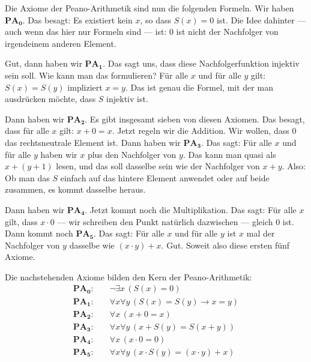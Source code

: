 \begin{spoken-clean}[00:07:37 - 00:11:00]
Die Axiome der Peano-Arithmetik sind nun die folgenden Formeln. Wir haben $\mathbf{PA_0}$. Das besagt: Es existiert kein $x$, so dass $S(x) = 0$ ist. Die Idee dahinter --- auch wenn das hier nur Formeln sind --- ist: $0$ ist nicht der Nachfolger von irgendeinem anderen Element.

Gut, dann haben wir $\mathbf{PA_1}$. Das sagt uns, dass diese Nachfolgerfunktion injektiv sein soll. Wie kann man das formulieren? Für alle $x$ und für alle $y$ gilt: $S(x) = S(y)$ impliziert $x = y$. Das ist genau die Formel, mit der man ausdrücken möchte, dass $S$ injektiv ist.

Dann haben wir $\mathbf{PA_2}$. Es gibt insgesamt sieben von diesen Axiomen. Das besagt, dass für alle $x$ gilt: $x + 0 = x$. Jetzt regeln wir die Addition. Wir wollen, dass $0$ das rechtsneutrale Element ist. Dann haben wir $\mathbf{PA_3}$. Das sagt: Für alle $x$ und für alle $y$ haben wir $x$ plus den Nachfolger von $y$. Das kann man quasi als $x + (y + 1)$ lesen, und das soll dasselbe sein wie der Nachfolger von $x + y$. Also: Ob man das $S$ einfach auf das hintere Element anwendet oder auf beide zusammen, es kommt dasselbe heraus.

Dann haben wir $\mathbf{PA_4}$. Jetzt kommt noch die Multiplikation. Das sagt: Für alle $x$ gilt, dass $x \cdot 0$ --- wir schreiben den Punkt natürlich dazwischen --- gleich $0$ ist. Dann kommt noch $\mathbf{PA_5}$. Das sagt: Für alle $x$ und für alle $y$ ist $x$ mal der Nachfolger von $y$ dasselbe wie $(x \cdot y) + x$. Gut. Soweit also diese ersten fünf Axiome.
\end{spoken-clean}

\begin{math-stroke}
\begin{axioms}
Die nachstehenden Axiome bilden den Kern der Peano-Arithmetik:
\begin{align}
\mathbf{PA_0}\colon &\quad \neg \exists x \, (S(x) = 0) \label{eq:pa0}\\
\mathbf{PA_1}\colon &\quad \forall x \forall y \, (S(x) = S(y) \to x = y) \label{eq:pa1}\\
\mathbf{PA_2}\colon &\quad \forall x \, (x + 0 = x) \label{eq:pa2}\\
\mathbf{PA_3}\colon &\quad \forall x \forall y \, (x + S(y) = S(x + y)) \label{eq:pa3}\\
\mathbf{PA_4}\colon &\quad \forall x \, (x \cdot 0 = 0) \label{eq:pa4}\\
\mathbf{PA_5}\colon &\quad \forall x \forall y \, (x \cdot S(y) = (x \cdot y) + x) \label{eq:pa5}
\end{align}
\end{axioms}
\end{math-stroke}

